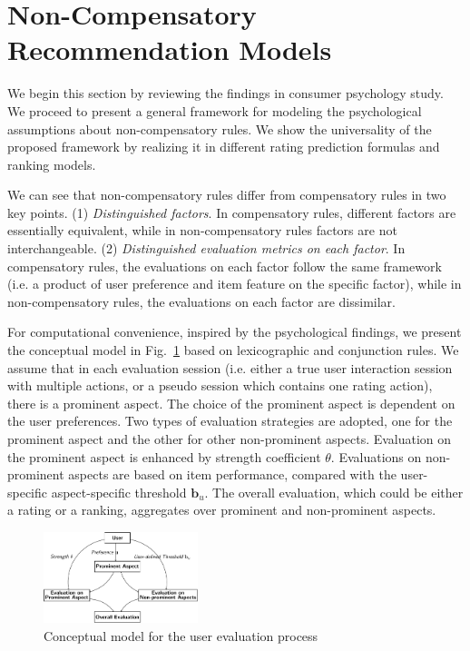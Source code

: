 \documentclass[letterpaper]{article} %
\begin{document}
\section{Non-Compensatory Recommendation Models}\label{sec:Nmodel}
We begin this section by reviewing the findings in consumer psychology study. We proceed to present a general framework for modeling the psychological assumptions about non-compensatory rules. We show the universality of the proposed framework by realizing it in different rating prediction formulas and ranking models.

We can see that non-compensatory rules differ from compensatory rules in two key points. (1) \textit{Distinguished factors}. In compensatory rules, different factors are essentially equivalent, while in non-compensatory rules factors are not interchangeable. (2) \textit{Distinguished evaluation metrics on each factor}. In compensatory rules, the evaluations on each factor follow the same framework (i.e. a product of user preference and item feature on the specific factor), while in non-compensatory rules, the evaluations on each factor are dissimilar.  

For computational convenience, inspired by the psychological findings, we present the conceptual model in Fig.~\ref{fig:model} based on lexicographic and conjunction rules. We assume that in each evaluation session (i.e. either a true user interaction session with multiple actions, or a pseudo session which contains one rating action), there is a prominent aspect. The choice of the prominent aspect is dependent on the user preferences. Two types of evaluation strategies are adopted, one for the prominent aspect and the other for other non-prominent aspects. Evaluation on the prominent aspect is enhanced by strength coefficient $\theta$. Evaluations on non-prominent aspects are based on item performance, compared with the user-specific aspect-specific threshold $\mathbf{b}_u$. The overall evaluation, which could be either a rating or a ranking, aggregates over prominent and non-prominent aspects. 

\begin{figure}[htbp]
\begin{center}
\includegraphics[width=0.4\textwidth]{conceptualmodel.pdf}
\caption{Conceptual model for the user evaluation process}
\label{fig:model}
\end{center}
\end{figure}
\end{document}
